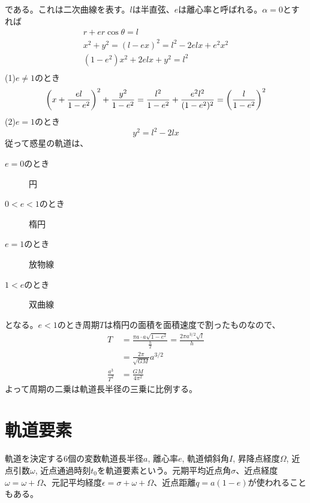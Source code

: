 	である。これは二次曲線を表す。$l$は半直弦、$e$は離心率と呼ばれる。$\alpha = 0$とすれば
	\begin{gather*}
		r + er\cos\theta = l\\
		x^2 + y^2 = (l - ex)^2 = l^2 - 2elx + e^2x^2\\
        (1-e^2)x^2 + 2elx + y^2 = l^2\\
    \end{gather*}
    (1)$e \neq 1$のとき
		\[\left( x + \frac{el}{1 - e^2}  \right)^2 + \frac{y^2}{1 - e^2} = \frac{l^2}{1 - e^2} + \frac{e^2l^2}{(1 - e^2)^2} = \left(\frac{l}{1 - e^2} \right)^2\]
	(2)$e = 1$のとき
		\[y^2 = l^2 - 2lx\]
	従って惑星の軌道は、
	\begin{description}
		\item[$e = 0$のとき] 円
		\item[$0 < e < 1$のとき] 楕円
		\item[$e = 1$のとき] 放物線
		\item[$1 < e$のとき] 双曲線
	\end{description}
	となる。$e < 1$のとき周期$T$は楕円の面積を面積速度で割ったものなので、
	\begin{align*}
		T &= \frac{\pi a \cdot a\sqrt{1 - e^2}}{\frac{h}{2}}
		= \frac{2\pi a^{3/2}\sqrt{l}}{h}\\
		&= \frac{2\pi}{\sqrt{GM}}a^{3/2}\\
		\frac{a^3}{T^2} &= \frac{GM}{4\pi^2}
	\end{align*}
	よって周期の二乗は軌道長半径の三乗に比例する。

\section{軌道要素}
	軌道を決定する6個の変数軌道長半径$a$, 離心率$e$, 軌道傾斜角$I$, 昇降点経度$\Omega$, 近点引数$\omega$, 近点通過時刻$t_0$を軌道要素という。元期平均近点角$\sigma$、近点経度$\omega = \omega + \Omega$、元記平均経度$\epsilon = \sigma + \omega + \Omega$、近点距離$q = a(1 - e)$が使われることもある。

